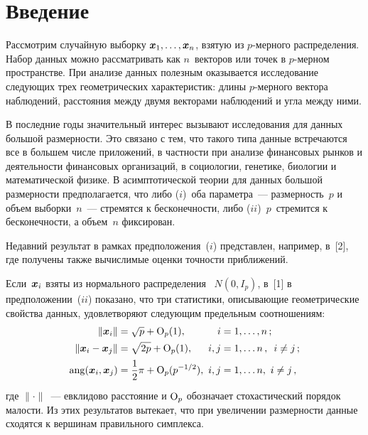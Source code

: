 
\vspace*{3pt}


      \thispagestyle{headings}

      \begin{multicols}{2}

      \label{st\stat}

\section{Введение}

Рассмотрим случайную выборку  $\mbox{\boldmath{$x$}}_1, \ldots, \mbox{\boldmath{$x$}}_n$, взятую из  $p$-мер\-но\-го распределения. 
Набор данных можно рассматривать как  $n$~векторов или точек в $p$-мер\-ном пространстве. При анализе данных 
полезным оказывается исследование следующих трех геометрических характеристик: длины $p$-мер\-но\-го 
вектора наблюдений, расстояния между двумя векторами наблюдений и угла между ними.

В последние годы значительный интерес вызывают исследования для данных большой раз\-мер\-ности. 
Это связано с тем, что такого типа данные встречаются все в большем числе приложений, в частности 
при анализе финансовых рынков и деятельности финансовых организаций, в социологии, генетике, биологии 
и математической физике.
В асимптотической теории для данных большой размерности предполагается, что либо ($i$)~оба параметра~--- 
размерность~$p$ и объем выборки~$n$~--- стремятся к бесконечности, либо ($ii$)~$p$~стремится к бесконечности, а 
объем~$n$ фиксирован.

 Недавний результат в рамках предположения~($i$) представлен, например, в~[2], где получены также вычислимые 
 оценки точности приближений.

 Если~$\mbox{\boldmath{$x$}}_i$  взяты из нормального распределения~ $N(0, I_p)$,  в~[1] в предположении~($ii$) 
 показано, что три статистики, описывающие геометрические свойства данных, удовлетворяют следующим 
 предельным соотношениям:
\begin{align*}
\|\vx_i\| &= \sqrt{p} +\O_p(1), \!\!\!& i&=1,\ldots,n\,; \\
\|\vx_i- \vx_j\| &= \sqrt{2p} +\O_p(1), \!\!\!& i,j&=1,\ldots n\,,\enskip i \neq j\,; \\
\mathrm{ang}(\vx_i,\vx_j) &= \fr{1}{2}\pi +\O_p(p^{-1/2}),\!\!\!& i,j&=1,\ldots n,~i \neq j\,,
\end{align*}
где $\| \cdot \|$~--- евклидово расстояние и  $\mbox{\rm O}_p$ обозначает стохастический порядок малости. 
Из этих  результатов вытекает, что при увеличении размерности данные сходятся к вершинам правильного симплекса.


\end{multicols}
